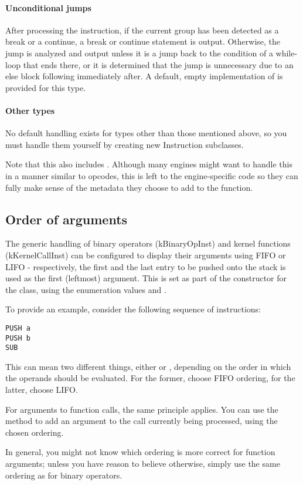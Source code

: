 \paragraph{Unconditional jumps}
After processing the instruction, if the current group has been detected as a break or a continue, a break or continue statement is output. Otherwise, the jump is analyzed and output unless it is a jump back to the condition of a while-loop that ends there, or it is determined that the jump is unnecessary due to an else block following immediately after. A default, empty implementation of  is provided for this type.

\paragraph{Other types}
No default handling exists for types other than those mentioned above, so you must handle them yourself by creating new Instruction subclasses.

Note that this also includes . Although many engines might want to handle this in a manner similar to  opcodes, this is left to the engine-specific code so they can fully make sense of the metadata they choose to add to the function.

\subsection{Order of arguments}
\label{sec:argOrder}
The generic handling of binary operators (kBinaryOpInst) and kernel functions (kKernelCallInst) can be configured to display their arguments using FIFO or LIFO - respectively, the first and the last entry to be pushed onto the stack is used as the first (leftmost) argument. This is set as part of the constructor for the  class, using the enumeration values  and .

To provide an example, consider the following sequence of instructions:

\begin{bytecode}
\begin{lstlisting}
PUSH a
PUSH b
SUB
\end{lstlisting}
\end{bytecode}

This can mean two different things, either  or , depending on the order in which the operands should be evaluated. For the former, choose FIFO ordering, for the latter, choose LIFO.

For arguments to function calls, the same principle applies. You can use the  method to add an argument to the call currently being processed, using the chosen ordering.

In general, you might not know which ordering is more correct for function arguments; unless you have reason to believe otherwise, simply use the same ordering as for binary operators.
